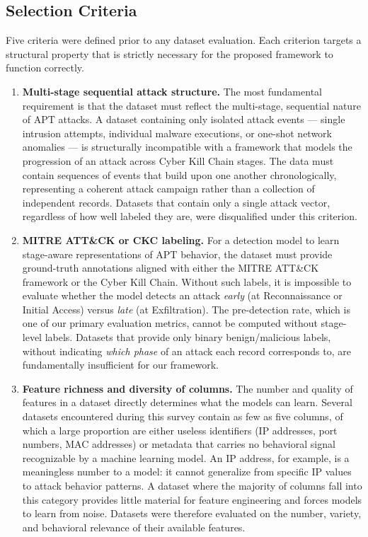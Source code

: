 \subsection{Selection Criteria}

Five criteria were defined prior to any dataset evaluation. Each criterion targets a
structural property that is strictly necessary for the proposed framework to function
correctly.

\begin{enumerate}

    \item \textbf{Multi-stage sequential attack structure.}
    The most fundamental requirement is that the dataset must reflect the multi-stage,
    sequential nature of APT attacks. A dataset containing only isolated attack events
    --- single intrusion attempts, individual malware executions, or one-shot
    network anomalies --- is structurally incompatible with a framework that models
    the progression of an attack across Cyber Kill Chain stages. The data must contain
    sequences of events that build upon one another chronologically, representing a
    coherent attack campaign rather than a collection of independent records. Datasets
    that contain only a single attack vector, regardless of how well labeled they are,
    were disqualified under this criterion.

    \item \textbf{MITRE ATT\&CK or CKC labeling.}
    For a detection model to learn stage-aware representations of APT behavior, the
    dataset must provide ground-truth annotations aligned with either the MITRE ATT\&CK
    framework or the Cyber Kill Chain. Without such labels, it is impossible to evaluate
    whether the model detects an attack \textit{early} (at Reconnaissance or Initial
    Access) versus \textit{late} (at Exfiltration). The pre-detection rate, which is one
    of our primary evaluation metrics, cannot be computed without stage-level labels.
    Datasets that provide only binary benign/malicious labels, without indicating
    \textit{which phase} of an attack each record corresponds to, are fundamentally
    insufficient for our framework.

    \item \textbf{Feature richness and diversity of columns.}
    The number and quality of features in a dataset directly determines what the models
    can learn. Several datasets encountered during this survey contain as few as five
    columns, of which a large proportion are either useless identifiers (IP addresses,
    port numbers, MAC addresses) or metadata that carries no behavioral signal
    recognizable by a machine learning model. An IP address, for example, is a
    meaningless number to a model: it cannot generalize from specific IP values to
    attack behavior patterns. A dataset where the majority of columns fall into this
    category provides little material for feature engineering and forces models to
    learn from noise. Datasets were therefore evaluated on the number, variety, and
    behavioral relevance of their available features.


\end{enumerate}
